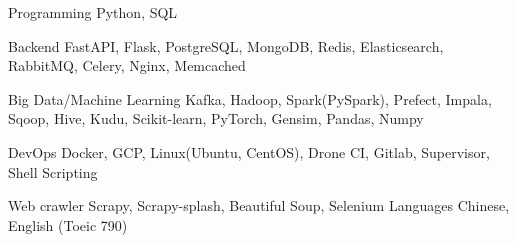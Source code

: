 

\begin{cvskills}

  \cvskill
    {Programming} %
    {Python, SQL} %

  \cvskill
    {Backend} %
    {FastAPI, Flask, PostgreSQL, MongoDB, Redis, Elasticsearch, RabbitMQ, Celery, Nginx, Memcached} %

  \cvskill
    {Big Data/Machine Learning} %
    {Kafka, Hadoop, Spark(PySpark), Prefect, Impala, Sqoop, Hive, Kudu, Scikit-learn, PyTorch, Gensim, Pandas, Numpy} %

  \cvskill
    {DevOps} %
    {Docker, GCP, Linux(Ubuntu, CentOS), Drone CI, Gitlab, Supervisor, Shell Scripting}

  \cvskill
    {Web crawler}
    {Scrapy, Scrapy-splash, Beautiful Soup, Selenium}
  \cvskill
    {Languages} %
    {Chinese, English (Toeic 790)} %

\end{cvskills}
